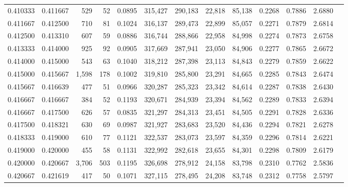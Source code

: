\begin{tabular}{rrrrrrrrrrrrr}
0.410333 & 0.411667 &   529 &  52 &                                     0.0895 & 315,427 & 290,183 &  22,818 &  85,138 & 0.2268 & 0.7886 & 2.6880 \\
0.411667 & 0.412500 &   710 &  81 &                                     0.1024 & 316,137 & 289,473 &  22,899 &  85,057 & 0.2271 & 0.7879 & 2.6814 \\
0.412500 & 0.413310 &   607 &  59 &                                     0.0886 & 316,744 & 288,866 &  22,958 &  84,998 & 0.2274 & 0.7873 & 2.6758 \\
0.413333 & 0.414000 &   925 &  92 &                                     0.0905 & 317,669 & 287,941 &  23,050 &  84,906 & 0.2277 & 0.7865 & 2.6672 \\
0.414000 & 0.415000 &   543 &  63 &                                     0.1040 & 318,212 & 287,398 &  23,113 &  84,843 & 0.2279 & 0.7859 & 2.6622 \\
0.415000 & 0.415667 & 1,598 & 178 &                                     0.1002 & 319,810 & 285,800 &  23,291 &  84,665 & 0.2285 & 0.7843 & 2.6474 \\
0.415667 & 0.416639 &   477 &  51 &                                     0.0966 & 320,287 & 285,323 &  23,342 &  84,614 & 0.2287 & 0.7838 & 2.6430 \\
0.416667 & 0.416667 &   384 &  52 &                                     0.1193 & 320,671 & 284,939 &  23,394 &  84,562 & 0.2289 & 0.7833 & 2.6394 \\
0.416667 & 0.417500 &   626 &  57 &                                     0.0835 & 321,297 & 284,313 &  23,451 &  84,505 & 0.2291 & 0.7828 & 2.6336 \\
0.417500 & 0.418321 &   630 &  69 &                                     0.0987 & 321,927 & 283,683 &  23,520 &  84,436 & 0.2294 & 0.7821 & 2.6278 \\
0.418333 & 0.419000 &   610 &  77 &                                     0.1121 & 322,537 & 283,073 &  23,597 &  84,359 & 0.2296 & 0.7814 & 2.6221 \\
0.419000 & 0.420000 &   455 &  58 &                                     0.1131 & 322,992 & 282,618 &  23,655 &  84,301 & 0.2298 & 0.7809 & 2.6179 \\
0.420000 & 0.420667 & 3,706 & 503 &                                     0.1195 & 326,698 & 278,912 &  24,158 &  83,798 & 0.2310 & 0.7762 & 2.5836 \\
0.420667 & 0.421619 &   417 &  50 &                                     0.1071 & 327,115 & 278,495 &  24,208 &  83,748 & 0.2312 & 0.7758 & 2.5797 \\

\end{tabular}
